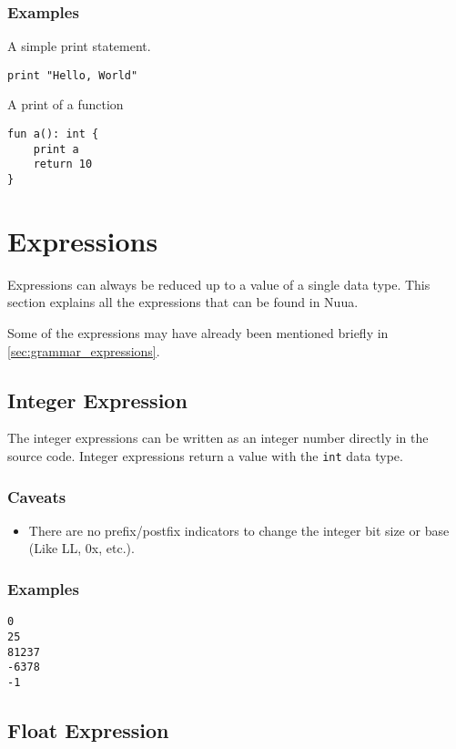 \subsubsection{Examples}

A simple print statement.
\begin{lstlisting}
print "Hello, World"
\end{lstlisting}
A print of a function
\begin{lstlisting}
fun a(): int {
    print a
    return 10
}
\end{lstlisting}

\section{Expressions}

Expressions can always be reduced up to a value of a single data type. This section explains all the expressions that can be found
in Nuua.

Some of the expressions may have already been mentioned briefly in \autoref{sec:grammar_expressions}.

\subsection{Integer Expression}

The integer expressions can be written as an integer number directly in the source code.
Integer expressions return a value with the \texttt{int} data type.

\subsubsection{Caveats}

\begin{itemize}
    \item There are no prefix/postfix indicators to change the integer bit size or base (Like LL, 0x, etc.).
\end{itemize}

\subsubsection{Examples}

\begin{lstlisting}
0
25
81237
-6378
-1
\end{lstlisting}

\subsection{Float Expression}

